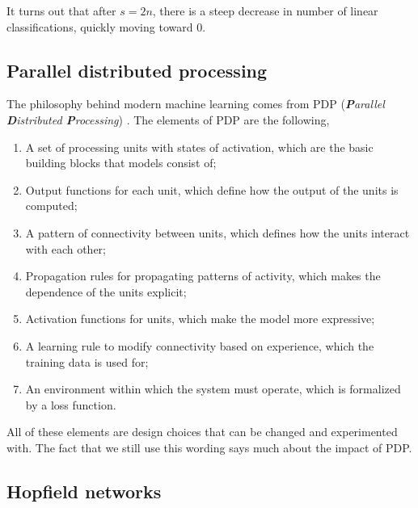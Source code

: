 It turns out that after $s=2n$, there is a steep decrease in number of linear classifications,
quickly moving toward 0.

\subsection{Parallel distributed processing}

The philosophy behind modern machine learning comes from PDP (\textit{\textbf{P}arallel
    \textbf{D}istributed \textbf{P}rocessing}) \citep{rumelhart1986general}. The elements of PDP are
the following,
\begin{enumerate}
    \item A set of processing units with states of activation, which are the basic building blocks that
          models consist of;
    \item Output functions for each unit, which define how the output of the units is computed;
    \item A pattern of connectivity between units, which defines how the units interact with each other;
    \item Propagation rules for propagating patterns of activity, which makes the dependence of the units
          explicit;
    \item Activation functions for units, which make the model more expressive;
    \item A learning rule to modify connectivity based on experience, which the training data is used for;
    \item An environment within which the system must operate, which is formalized by a loss function.
\end{enumerate}
All of these elements are design choices that can be changed and experimented with. The fact that we
still use this wording says much about the impact of PDP.

%

\subsection{Hopfield networks}

